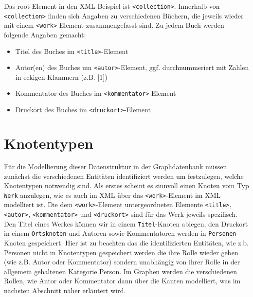 \documentclass[ngerman,]{scrreprt}
\providecommand{\tightlist}{%
  \setlength{\itemsep}{0pt}\setlength{\parskip}{0pt}}
\begin{document}
Das root-Element in den XML-Beispiel ist \texttt{\textless{}collection\textgreater{}}. Innerhalb von \texttt{\textless{}collection\textgreater{}} finden sich Angaben zu verschiedenen Büchern, die jeweils wieder mit einem \texttt{\textless{}work\textgreater{}}-Element zusammengefasst sind. Zu jedem Buch werden folgende Angaben gemacht:

\begin{itemize}
\tightlist
\item
  Titel des Buches im \texttt{\textless{}title\textgreater{}}-Element
\item
  Autor(en) des Buches um \texttt{\textless{}autor\textgreater{}}-Element, ggf. durchnummeriert mit Zahlen in eckigen Klammern (z.B. {[}1{]})
\item
  Kommentator des Buches im \texttt{\textless{}kommentator\textgreater{}}-Element
\item
  Druckort des Buches im \texttt{\textless{}druckort\textgreater{}}-Element
\end{itemize}

\section{Knotentypen}\label{knotentypen}

Für die Modellierung dieser Datenstruktur in der Graphdatenbank müssen zunächst die verschiedenen Entitäten identifiziert werden um festzulegen, welche Knotentypen notwendig sind. Als erstes scheint es sinnvoll einen Knoten vom Typ \texttt{Werk} anzulegen, wie es auch im XML über das \texttt{\textless{}work\textgreater{}}-Element im XML modelliert ist. Die dem \texttt{\textless{}work\textgreater{}}-Element untergeordneten Elemente \texttt{\textless{}title\textgreater{}}, \texttt{\textless{}autor\textgreater{}}, \texttt{\textless{}kommentator\textgreater{}} und \texttt{\textless{}druckort\textgreater{}} sind für das Werk jeweils spezifisch. Den Titel eines Werkes können wir in einem \texttt{Titel}-Knoten ablegen, den Druckort in einem \texttt{Ortsknoten} und Autoren sowie Kommentatoren werden in \texttt{Personen}-Knoten gespeichert. Hier ist zu beachten das die identifizierten Entitäten, wie z.b. Personen nicht in Knotentypen gespeichert werden die ihre Rolle wieder geben (wie z.B. Autor oder Kommentator) sondern unabhängig von ihrer Rolle in der allgemein gehaltenen Kategorie Person. Im Graphen werden die verschiedenen Rollen, wie Autor oder Kommentator dann über die Kanten modelliert, was im nächsten Abschnitt näher erläutert wird.
\end{document}
